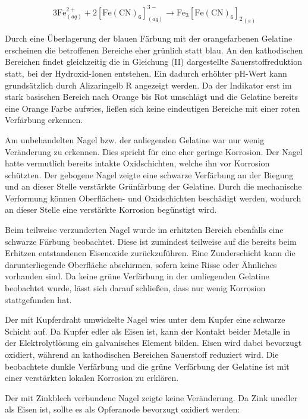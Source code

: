 \documentclass[12pt,a4paper]{article}
\begin{document}
\begin{equation*}
  3\mathrm{Fe}^{2+}_{(aq)}+2[\mathrm{Fe(CN)_6}]^{3-}_{(aq)}
  \rightarrow \mathrm{Fe_3[Fe(CN)_6]_2}_{(s)}
\end{equation*}

Durch eine Überlagerung der blauen Färbung mit der orangefarbenen Gelatine erscheinen die betroffenen Bereiche eher grünlich statt blau.
An den kathodischen Bereichen findet gleichzeitig die in Gleichung (II) dargestellte Sauerstoffreduktion statt, bei der Hydroxid-Ionen entstehen.
Ein dadurch erhöhter pH-Wert kann grundsätzlich durch Alizaringelb R angezeigt werden.
Da der Indikator erst im stark basischen Bereich nach Orange bis Rot umschlägt und die Gelatine bereits eine Orange Farbe aufwies,
ließen sich keine eindeutigen Bereiche mit einer roten Verfärbung erkennen.

Am unbehandelten Nagel bzw. der anliegenden Gelatine war nur wenig Veränderung zu erkennen. 
Dies spricht für eine eher geringe Korrosion. Der Nagel hatte vermutlich bereits intakte Oxidschichten,
welche ihn vor Korrosion schützten. Der gebogene Nagel zeigte eine schwarze Verfärbung an der Biegung und an dieser Stelle verstärkte Grünfärbung der Gelatine.
Durch die mechanische Verformung können Oberflächen- und Oxidschichten beschädigt werden, wodurch an dieser Stelle eine verstärkte Korrosion begünstigt wird. 

Beim teilweise verzunderten Nagel wurde im erhitzten Bereich ebenfalls eine schwarze Färbung beobachtet.
Diese ist zumindest teilweise auf die bereits beim Erhitzen entstandenen Eisenoxide zurückzuführen.
Eine Zunderschicht kann die darunterliegende Oberfläche abschirmen, sofern keine Risse oder Ähnliches vorhanden sind.
Da keine grüne Verfärbung in der umliegenden Gelatine beobachtet wurde, lässt sich darauf schließen, dass nur wenig Korrosion stattgefunden hat.

Der mit Kupferdraht umwickelte Nagel wies unter dem Kupfer eine schwarze Schicht auf. 
Da Kupfer edler als Eisen ist, kann der Kontakt beider Metalle in der Elektrolytlösung ein galvanisches Element bilden.
Eisen wird dabei bevorzugt oxidiert, während an kathodischen Bereichen Sauerstoff reduziert wird.
Die beobachtete dunkle Verfärbung und die grüne Verfärbung der Gelatine ist mit einer verstärkten lokalen Korrosion zu erklären.

Der mit Zinkblech verbundene Nagel zeigte keine Veränderung. Da Zink unedler als Eisen ist, sollte es als Opferanode bevorzugt oxidiert werden:
\end{document}
